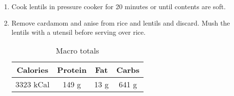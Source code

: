 \documentclass{report}
\begin{document}
\begin{multicols}{2}
\begin{enumerate}
\item Cook lentils in pressure cooker for 20 minutes or until contents are soft. 
\item Remove cardamom and anise from rice and lentils and discard. Mush the lentils with a utensil before serving over rice. 


\begin{table}[H]
  \begin{center}
    \caption{Macro totals}
    \label{tab:table1}
    \begin{tabular}{c|c|c|c} %
      \textbf{Calories} & \textbf{Protein} & \textbf{Fat} & \textbf{Carbs}\\
      \hline
      3323 kCal & 149 g & 13 g & 641 g\\
    \end{tabular}
  \end{center}
\end{table}
 
\end{enumerate}
\end{multicols}




\end{document}
